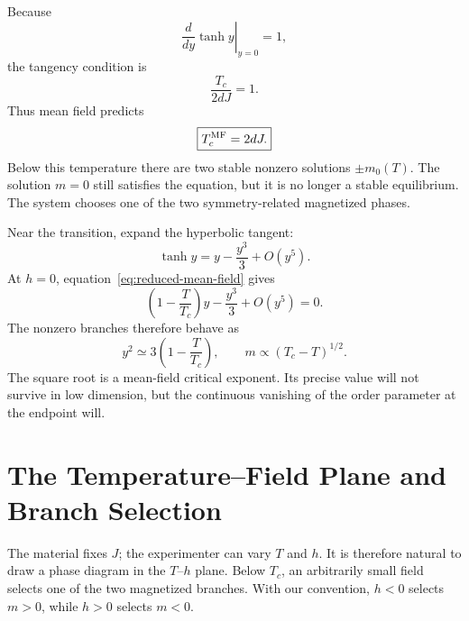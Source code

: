 Because
\begin{equation}
\left.\frac{d}{dy}\tanh y\right|_{y=0}=1,
\end{equation}
the tangency condition is
\begin{equation}
\frac{T_c}{2dJ}=1.
\end{equation}
Thus mean field predicts
\begin{equation}
\boxed{T_c^{\rm MF}=2dJ.}
\label{eq:sm10-mean-field-tc}
\end{equation}
Below this temperature there are two stable nonzero solutions \(\pm m_0(T)\). The solution \(m=0\) still satisfies the equation, but it is no longer a stable equilibrium. The system chooses one of the two symmetry-related magnetized phases.

\begin{classroomqa}
\end{classroomqa}

Near the transition, expand the hyperbolic tangent:
\begin{equation}
\tanh y=y-\frac{y^3}{3}+O(y^5).
\end{equation}
At \(h=0\), equation~\eqref{eq:reduced-mean-field} gives
\begin{equation}
\left(1-\frac{T}{T_c}\right)y-\frac{y^3}{3}+O(y^5)=0.
\end{equation}
The nonzero branches therefore behave as
\begin{equation}
y^2\simeq3\left(1-\frac{T}{T_c}\right),
\qquad
m\propto(T_c-T)^{1/2}.
\label{eq:mf-beta-exponent}
\end{equation}
The square root is a mean-field critical exponent. Its precise value will not survive in low dimension, but the continuous vanishing of the order parameter at the endpoint will.

\section{The Temperature--Field Plane and Branch Selection}

The material fixes \(J\); the experimenter can vary \(T\) and \(h\). It is therefore natural to draw a phase diagram in the \(T\)--\(h\) plane. Below \(T_c\), an arbitrarily small field selects one of the two magnetized branches. With our convention, \(h<0\) selects \(m>0\), while \(h>0\) selects \(m<0\).

